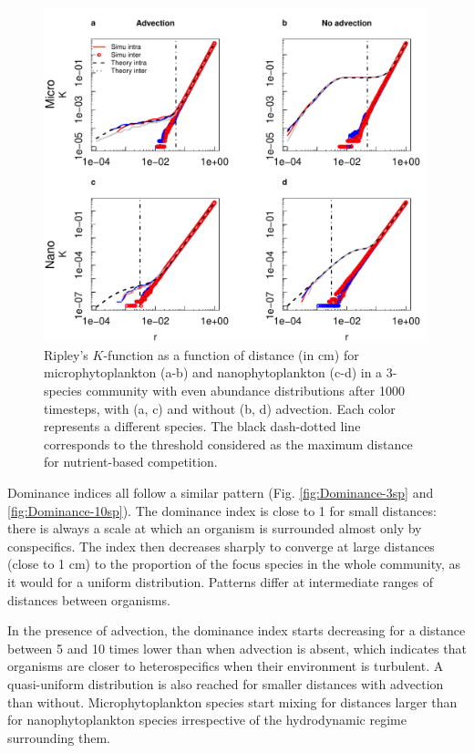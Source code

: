 \documentclass[english]{article}
\begin{document}
\begin{figure}[H]
\begin{centering}
\includegraphics[width=0.99\textwidth]{../code/figure/K_micronano}
\par\end{centering}
\caption{Ripley's $K$-function as a function of distance (in cm) for microphytoplankton
(a-b) and nanophytoplankton (c-d) in a 3-species community with even
abundance distributions after 1000 timesteps, with (a, c) and without
(b, d) advection. Each color represents a different species. The black
dash-dotted line corresponds to the threshold considered as the maximum
distance for nutrient-based competition.\label{fig:Ripley's-K-function}
}
\end{figure}

Dominance indices all follow a similar pattern (Fig. \ref{fig:Dominance-3sp}
and \ref{fig:Dominance-10sp}). The dominance index is close to 1
for small distances: there is always a scale at which an organism
is surrounded almost only by conspecifics. The index then decreases
sharply to converge at large distances (close to 1 cm) to the proportion
of the focus species in the whole community, as it would for a uniform
distribution. Patterns differ at intermediate ranges of distances
between organisms.

In the presence of advection, the dominance index starts decreasing
for a distance between 5 and 10 times lower than when advection is
absent, which indicates that organisms are closer to heterospecifics
when their environment is turbulent. A quasi-uniform distribution
is also reached for smaller distances with advection than without.
Microphytoplankton species start mixing for distances larger than
for nanophytoplankton species irrespective of the hydrodynamic regime
surrounding them.
\end{document}
